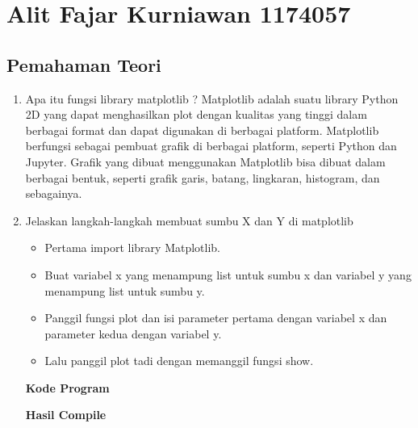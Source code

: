 \section{Alit Fajar Kurniawan 1174057}
\subsection{Pemahaman Teori}
	\begin{enumerate}

		\item Apa itu fungsi library matplotlib ?
			\subitem Matplotlib adalah suatu library Python 2D yang dapat menghasilkan plot dengan kualitas yang tinggi dalam berbagai format dan dapat digunakan di berbagai platform. Matplotlib berfungsi sebagai pembuat grafik di berbagai platform, seperti Python dan Jupyter. Grafik yang dibuat menggunakan Matplotlib bisa dibuat dalam berbagai bentuk, seperti grafik garis, batang, lingkaran, histogram, dan sebagainya.
		
		\item Jelaskan langkah-langkah membuat sumbu X dan Y di matplotlib
			\begin{itemize}
				\item Pertama import library Matplotlib.	
				
				
				\item Buat variabel x yang menampung list untuk sumbu x dan variabel y yang menampung list untuk sumbu y.	
				
				
				\item Panggil fungsi plot dan isi parameter pertama dengan variabel x dan parameter kedua dengan variabel y.
					

				\item Lalu panggil plot tadi dengan memanggil fungsi show.
				
			\end{itemize}

			\hfill \break
			\textbf{Kode Program}
			
				
				
			\hfill \break
			\textbf{Hasil Compile}


\end{enumerate}
